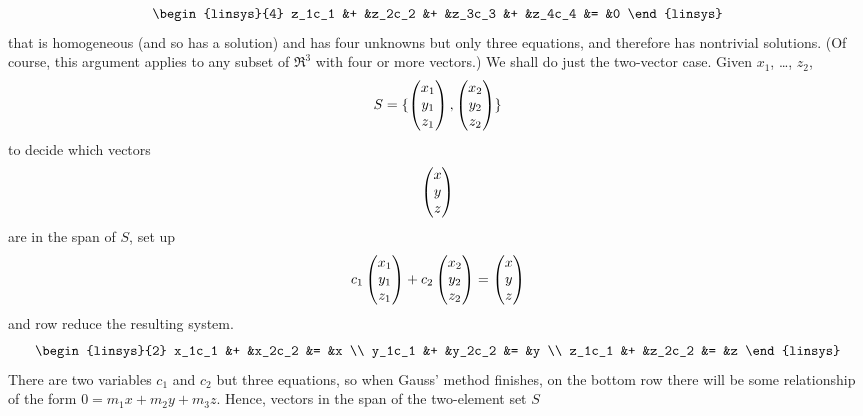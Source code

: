 \begin{exercises}
\begin{answer}
\begin{exparts}
\begin{equation*}
\begin{linsys}{4}
                z_1c_1  &+  &z_2c_2  &+  &z_3c_3  &+  &z_4c_4  &=  &0
             \end{linsys}
           \end{equation*}
           that is homogeneous (and so has a solution) and has 
           four unknowns but only three equations,
           and therefore has nontrivial solutions.
           (Of course, this argument applies to any subset of $\Re^3$ 
           with four or more vectors.) 
         \partsitem We shall do just the two-vector case.
           Given $x_1$, \ldots, $z_2$, 
           \begin{equation*}
             S=\mbox{$\{\begin{pmatrix} x_1 \\ y_1 \\ z_1 \end{pmatrix},
             \begin{pmatrix} x_2 \\ y_2 \\ z_2 \end{pmatrix}\}$} 
           \end{equation*}
           to decide which vectors
           \begin{equation*}
             \begin{pmatrix} x \\ y \\ z \end{pmatrix}
           \end{equation*}
           are in the span of $S$, set up 
           \begin{equation*}
             c_1\begin{pmatrix} x_1 \\ y_1 \\ z_1 \end{pmatrix}
             +c_2\begin{pmatrix} x_2 \\ y_2 \\ z_2 \end{pmatrix}
             =\begin{pmatrix} x \\ y \\ z \end{pmatrix}
           \end{equation*}
           and row reduce the resulting system.
           \begin{equation*}
             \begin{linsys}{2}
                x_1c_1  &+  &x_2c_2   &=  &x \\
                y_1c_1  &+  &y_2c_2   &=  &y \\
                z_1c_1  &+  &z_2c_2   &=  &z
             \end{linsys}
           \end{equation*}
           There are two
           variables $c_1$ and $c_2$ but three equations, so 
           when Gauss' method finishes, on the bottom
           row there will be some relationship of the form
           $0=m_1x+m_2y+m_3z$. 
           Hence, vectors in the span of the two-element set $S$

\end{exparts}
\end{answer}
\end{exercises}
